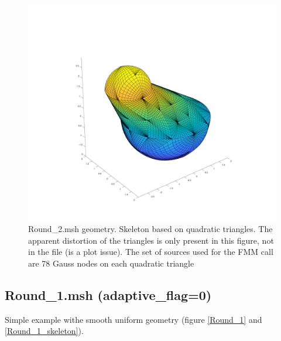 \documentclass[11pt, oneside]{article}   	%
\begin{document}
\begin{figure}[H]
\begin{center}
\includegraphics[width=6in]{Round_2_skeleton.pdf}
\end{center}
\caption{Round\_2.msh geometry. Skeleton based on quadratic triangles. The apparent distortion of the triangles is only present in this figure, not in the file (is a plot issue). The set of sources used for the FMM call are 78 Gauss nodes on each quadratic triangle}
\label{Round_2_skeleton}
\end{figure}






\newpage
\subsection{Round\_1.msh (adaptive\_flag=0)}
Simple example withe smooth uniform geometry (figure \ref{Round_1} and \ref{Round_1_skeleton}). 
\end{document}
